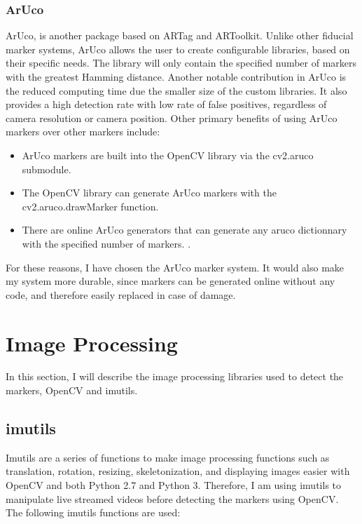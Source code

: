\documentclass[oneside,%
                    author={Malak Hajji},
                    degree={BSc},
                    title={Designing An Accessible Ozobot Programming Platform for Students},
                  subtitle={With Mixed Visual Abilities}]{dissertation}
\begin{document}
 
\subsubsection{ArUco}
ArUco\cite{aruco}, is another package based on ARTag and ARToolkit. Unlike other fiducial marker systems, ArUco allows the user to create configurable libraries, based on their specific needs. The library will only contain the specified number of markers with the greatest Hamming distance. Another notable contribution in ArUco is the reduced computing time due the smaller size of the custom libraries. It also provides a high detection rate with low rate of false positives, regardless of camera resolution or camera position. 
Other primary benefits of using ArUco markers over other markers include:

\begin{itemize}
  
\item ArUco markers are built into the OpenCV library via the cv2.aruco  submodule\cite{opencv-aruco}. 
\item	The OpenCV library can generate ArUco markers with the cv2.aruco.drawMarker function.
\item	There are online ArUco generators that can generate any aruco dictionnary with the specified number of markers. \cite{online-aruco}.

\end{itemize}
For these reasons, I have chosen the ArUco marker system. It would also make my system more durable, since markers can be generated online without any code, and therefore easily replaced in case of damage.

\section{Image Processing}
In this section, I will describe the image processing libraries used to detect the markers, OpenCV and imutils.

\subsection{imutils}

\noindent
Imutils are a series of functions to make image processing functions such as translation, rotation, resizing, skeletonization, and displaying images easier with OpenCV and both Python 2.7 and Python 3. Therefore, I am using imutils to manipulate live streamed videos before detecting the markers using OpenCV. The following imutils functions are used:
\end{document}
